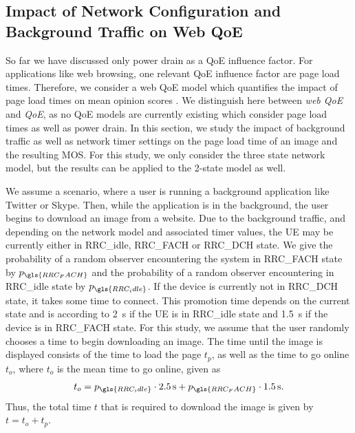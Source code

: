 \subsection{Impact of Network Configuration and Background Traffic on Web QoE}\label{sec:network:network_traces:numerical_results:web_qoe}
So far we have discussed only power drain as a \gls{QoE} influence factor.
For applications like web browsing, one relevant QoE influence factor are page load times.
Therefore, we consider a web QoE model which quantifies the impact of page load times on mean opinion scores \cite{egger2012a}.
We distinguish here between \emph{web \gls{QoE}} and \emph{\gls{QoE}}, as no \gls{QoE} models are currently existing which consider page load times as well as power drain.
In this section, we study the impact of background traffic as well as network timer settings on the page load time of an image and the resulting \gls{MOS}.
For this study, we only consider the three state network model, but the results can be applied to the 2-state model as well.

We assume a scenario, where a user is running a background application like Twitter or Skype.
Then, while the application is in the background, the user begins to download an image from a website.
Due to the background traffic, and depending on the network model and associated timer values, the \gls{UE} may be currently either in \gls{RRC_idle}, \gls{RRC_FACH} or \gls{RRC_DCH} state.
We give the probability of a random observer encountering the system in \gls{RRC_FACH} state by \(p_{\gls{RRC_FACH}}\) and the probability of a random observer encountering in \gls{RRC_idle} state by $p_{\gls{RRC_idle}}$.
If the device is currently not in \gls{RRC_DCH} state, it takes some time to connect.
This promotion time depends on the current state and is according to \cite{Qian2010b} \SI{2}{\second} if the \gls{UE} is in \gls{RRC_idle} state and \SI{1.5}{\second} if the device is in \gls{RRC_FACH} state.
For this study, we assume that the user randomly chooses a time to begin downloading an image.
The time until the image is displayed consists of the time to load the page \(t_p\), as well as the time to go online \(t_o\), where \(t_o\) is the mean time to go online, given as 
\[t_o = p_{\gls{RRC_idle}} \cdot \SI{2.5}{\second} + p_{\gls{RRC_FACH}} \cdot \SI{1.5}{\second}.\]
Thus, the total time \(t\) that is required to download the image is given by \(t = t_o + t_p\).

